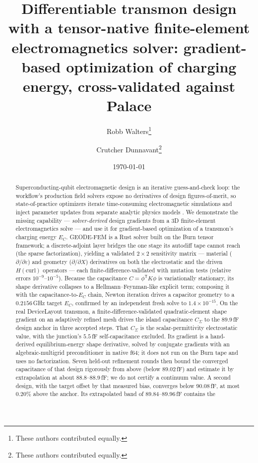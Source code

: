 \documentclass{anvil-paper}
\title{Differentiable transmon design with a tensor-native finite-element
electromagnetics solver: gradient-based optimization of charging energy,
cross-validated against Palace}
\author{Robb Walters\thanks{These authors contributed equally.}
  \and Crutcher Dunnavant\thanks{These authors contributed equally.}}
\date{\today}
\begin{document}
\maketitle

\begin{abstract}
Superconducting-qubit electromagnetic design is an iterative
guess-and-check loop: the workflow's production field solvers expose no
derivatives of design figures-of-merit, so state-of-practice optimizers
iterate time-consuming electromagnetic simulations and inject parameter
updates from separate analytic physics models
\citep{eriksson2025automated}. We demonstrate the missing capability ---
\emph{solver-derived} design gradients from a 3D finite-element
electromagnetics solve --- and use it for gradient-based optimization of a
transmon's charging energy $E_C$. GEODE-FEM is a Rust solver built on the
Burn tensor framework; a discrete-adjoint layer bridges the one stage its
autodiff tape cannot reach (the sparse factorization), yielding a
validated $2\times 2$ sensitivity matrix --- material ($\partial/\partial
\varepsilon$) and geometry ($\partial/\partial X$) derivatives on both the
electrostatic and the driven $H(\mathrm{curl})$ operators --- each
finite-difference-validated with mutation tests (relative errors
$10^{-9}$--$10^{-5}$). Because the capacitance $C = \phi^{\mathsf{T}}
K\phi$ is variationally stationary, its shape derivative collapses to a
Hellmann--Feynman-like explicit term; composing it with the
capacitance-to-$E_C$ chain, Newton iteration drives a capacitor geometry
to a $0.2156$\,GHz target $E_C$, confirmed by an independent fresh solve
to $1.4\times 10^{-15}$. On the real DeviceLayout transmon, a
finite-difference-validated quadratic-element shape gradient on an
adaptively refined mesh drives the island capacitance $C_\Sigma$ to the
$89.9$\,fF design anchor in three accepted steps. That $C_\Sigma$ is the
scalar-permittivity electrostatic value, with the junction's $5.5$\,fF
self-capacitance excluded. Its gradient is a hand-derived
equilibrium-energy shape derivative, solved by conjugate gradients with
an algebraic-multigrid preconditioner in native f64; it does not run on
the Burn tape and uses no factorization. Seven held-out
refinement rounds then bound the converged capacitance of that design
rigorously from above (below $89.02$\,fF) and estimate it by
extrapolation at about $88.8$--$88.9$\,fF; we do not certify a
continuum value. A second design, with the target offset by that
measured bias, converges below $90.08$\,fF, at most $0.20\%$ above the
anchor. Its extrapolated band of $89.84$--$89.96$\,fF contains the

\end{abstract}
\end{document}
